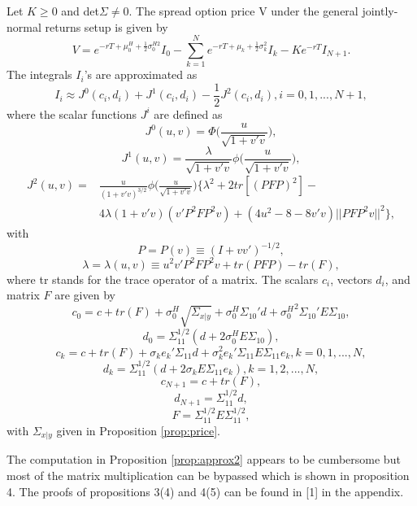 \documentclass[a4paper]{article}
\begin{document}
\begin{prop}
\label{prop:approx2}
Let $K\geq0$ and det$\Sigma \neq 0$. The spread option price V under the general jointly-normal returns setup is given by
\begin{equation}
\label{eq:cf2}
V=e^{-rT+\mu_0^H+\frac{1}{2}\sigma_0^{H2}}I_0-\sum_{k=1}^Ne^{-rT+\mu_k+\frac{1}{2}\sigma_k^2}I_k-Ke^{-rT}I_{N+1}.
\end{equation}
The integrals $I_i$'s are approximated as
$$I_i\approx J^0(c_i,d_i)+J^1(c_i,d_i)-\frac{1}{2}J^2(c_i,d_i), i=0,1,...,N+1,$$
where the scalar functions $J^i$ are defined as
\begin{equation}
\label{eq:j0}
J^0(u,v)=\Phi\Big(\frac{u}{\sqrt{1+v'v}}\Big),
\end{equation}
\begin{equation}
\label{eq:j1}
J^1(u,v)=\frac{\lambda}{\sqrt{1+v'v}}\phi\Big(\frac{u}{\sqrt{1+v'v}}\Big),
\end{equation}
\begin{equation}
\label{eq:j2}
\begin{split}
J^2(u,v)=&\frac{u}{(1+v'v)^{3/2}}\phi\Big(\frac{u}{\sqrt{1+v'v}}\Big)\Big\{\lambda^2+2tr[(PFP)^2]- \\
	&4\lambda(1+v'v)(v'P^2FP^2v)+(4u^2-8-8v'v)||PFP^2v||^2\Big\},
\end{split}
\end{equation}
with
\begin{equation}
\label{eq:p}
P=P(v)\equiv(I+vv')^{-1/2},
\end{equation}
$$\lambda=\lambda(u,v)\equiv u^2v'P^2FP^2v+tr(PFP)-tr(F),$$
where tr stands for the trace operator of a matrix. The scalars $c_i$, vectors $d_i$, and matrix $F$ are given by
$$c_0=c+tr(F)+\sigma_0^H\sqrt{\Sigma_{x|y}}+\sigma_0^H\Sigma_{10}'d+{\sigma_0^H}^2\Sigma_{10}'E\Sigma_{10},$$
$$d_0=\Sigma_{11}^{1/2}(d+2\sigma_0^HE\Sigma_{10}),$$
$$c_k=c+tr(F)+\sigma_ke_k'\Sigma_{11}d+\sigma_k^2e_k'\Sigma_{11}E\Sigma_{11}e_k,k=0,1,...,N,$$
$$d_k=\Sigma_{11}^{1/2}(d+2\sigma_kE\Sigma_{11}e_k),k=1,2,...,N,$$
$$c_{N+1}=c+tr(F),$$
$$d_{N+1}=\Sigma_{11}^{1/2}d,$$
$$F=\Sigma_{11}^{1/2}E\Sigma_{11}^{1/2},$$
with $\Sigma_{x|y}$ given in Proposition \ref{prop:price}.

\end{prop}

The computation in Proposition \ref{prop:approx2} appears to be cumbersome but most of the matrix multiplication can be bypassed which is shown in proposition 4. The proofs of propositions 3(4) and 4(5) can be found in [1] in the appendix. 
\end{document}
